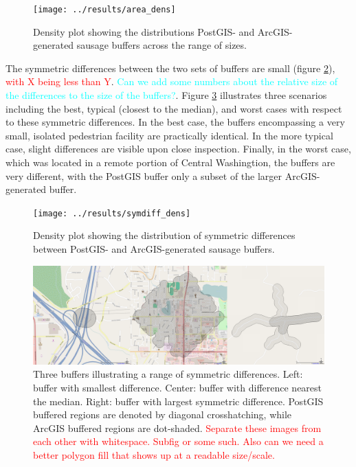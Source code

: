 \documentclass[11pt,letterpaper]{article} %
\begin{document}
\begin{figure}[h!]
  \centering
  \texttt{[image: ../results/area\_dens]}
  \caption{Density plot showing the distributions PostGIS- and
    ArcGIS-generated sausage buffers across the range of sizes.}
  \label{fig:area_dens}
\end{figure}

The symmetric differences between the two sets of
buffers are small (figure \ref{fig:symdiff_dens}), \textcolor{red}{with X being less than Y}. \textcolor{cyan}{Can we add some numbers about the relative size of the differences to the size of the buffers?}. Figure \ref{fig:symmetric_differences} illustrates
three scenarios including the best, typical (closest to the median),
and worst cases with respect to these symmetric differences. In the
best case, the buffers encompassing a very small, isolated
pedestrian facility are practically identical. In the more typical
case, slight differences are visible upon close inspection. Finally,
in the worst case, which was located in a remote portion of Central
Washingtion, the buffers are very different, with
the PostGIS buffer only a subset of the larger ArcGIS-generated buffer.

\begin{figure}[h!]
  \centering
  \texttt{[image: ../results/symdiff\_dens]}
  \caption{Density plot showing the distribution of symmetric
    differences between PostGIS- and ArcGIS-generated sausage buffers.}
  \label{fig:symdiff_dens}
\end{figure}

\begin{figure}[h!]
  \centering
  \includegraphics[width=\textwidth]{./figs/symmetric-differences}
  \caption{Three buffers illustrating a range of symmetric
    differences. Left: buffer with smallest difference. Center:
    buffer with difference nearest the median. Right: buffer with largest
    symmetric difference. PostGIS buffered regions are denoted by
    diagonal crosshatching, while ArcGIS buffered regions are
    dot-shaded. \textcolor{red}{Separate these images from each other with whitespace. Subfig or some such. Also can we need a better polygon fill that shows up at a readable size/scale.}}
  \label{fig:symmetric_differences}
\end{figure}
\end{document}
